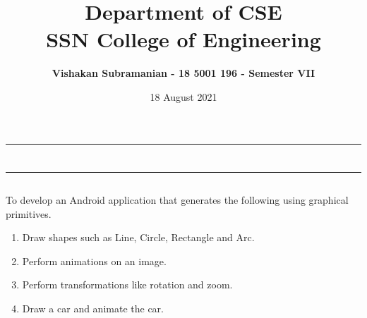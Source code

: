 \documentclass[12pt, a4]{article}
\title{\textbf{Department of CSE\\SSN College of Engineering}}
\author{\textbf{Vishakan Subramanian - 18 5001 196 - Semester VII}}
\date{18 August 2021}
\begin{document}
\maketitle
\hrule
\section*{}
\hrule
\bigskip

\subsection*{}
\subsection*{}
\begin{flushleft}
To develop an Android application that generates the following using graphical primitives.

\begin{enumerate}
\item Draw shapes such as Line, Circle, Rectangle and Arc.
\item Perform animations on an image.
\item Perform transformations like rotation and zoom.
\item Draw a car and animate the car.
\end{enumerate}

\end{flushleft}

\newpage
\subsection*{}
\begin{flushleft}

\end{flushleft}

\newpage
\subsection*{}
\begin{flushleft}

\end{flushleft}
\end{document}
